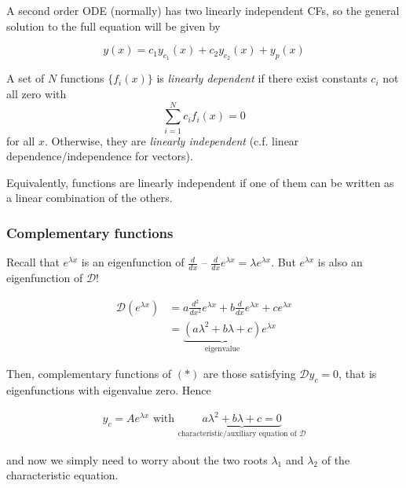 \documentclass{../../template/note}
\begin{document}
    A second order ODE (normally) has two linearly independent CFs, so the general solution to the full equation will be given by

    \[
        y(x) = c_1 y_{c_1}(x) + c_2 y_{c_2}(x) + y_p(x)
    \]

    \begin{definition}
        A set of \(N\) functions \(\{f_i(x)\}\) is \emph{linearly dependent} if there exist constants \(c_i\) not all zero with
        \[
            \sum_{i=1}^N c_i f_i(x) = 0
        \]
        for all \(x\). Otherwise, they are \emph{linearly independent} (c.f. linear dependence/independence for vectors).
    \end{definition}
    
    Equivalently, functions are linearly independent if one of them can be written as a linear combination of the others.

    \subsubsection{Complementary functions}

    Recall that \(e^{\lambda x}\) is an eigenfunction of \(\frac{d}{dx}\) -- \(\frac{d}{dx} e^{\lambda x} = \lambda e^{\lambda x}\). But \(e^{\lambda x}\) is also an eigenfunction of \(\mathcal D\)!

    \begin{align*}
        \mathcal D(e^{\lambda x}) &= a \frac{d^2}{dx^2}e^{\lambda x} + b\frac{d}{dx}e^{\lambda x} + ce^{\lambda x} \\
        &= \underbrace{(a\lambda^2 + b\lambda + c)}_{\text{eigenvalue}} e^{\lambda x}
    \end{align*}

    Then, complementary functions of \((*)\) are those satisfying \(\mathcal Dy_c = 0\), that is eigenfunctions with eigenvalue zero. Hence
    
    \begin{align*}
        y_c = Ae^{\lambda x} \text{ with } \underbrace{a\lambda^2 + b\lambda + c = 0}_{\text{characteristic/auxiliary equation of } \mathcal D}
    \end{align*}
    
    and now we simply need to worry about the two roots \(\lambda_1\) and \(\lambda_2\) of the characteristic equation.
\end{document}
